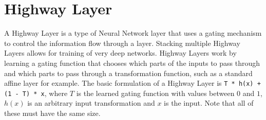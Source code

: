 \chapter{Highway Layer}
A Highway Layer is a type of Neural Network layer that uses a gating mechanism to control the information flow through a layer. Stacking multiple Highway Layers allows for training of very deep networks. Highway Layers work by learning a gating function that chooses which parts of the inputs to pass through and which parts to pass through a transformation function, such as a standard affine layer for example. The basic formulation of a Highway Layer is \texttt{T * h(x) + (1 - T) * x}, where $T$ is the learned gating function with values between $0$ and $1$, $h(x)$ is an arbitrary input transformation and $x$ is the input. Note that all of these must have the same size.


